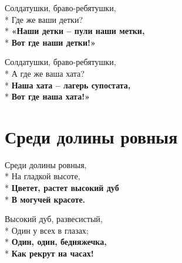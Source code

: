 \medskip

\begin{minipage}{\linewidth}
Солдатушки, браво-ребятушки,\\*
Где же ваши детки?\\*
\textbf{«Наши детки – пули наши метки,}\\*
\textbf{Вот где наши детки!»}\\
\end{minipage}\par\medskip\nobreak

\medskip

\begin{minipage}{\linewidth}
Солдатушки, браво-ребятушки,\\*
А где же ваша хата?\\*
\textbf{Наша хата – лагерь супостата,}\\*
\textbf{Вот где наша хата!»}\\
\end{minipage}

\vspace{\fill}\newpage

\section{Среди долины ровныя}
\label{song:Среди_долины_ровныя}

\medskip

\begin{minipage}{\linewidth}
Среди долины ровныя,\\*
На гладкой высоте,\\*
\textbf{Цветет, растет высокий дуб}\\*
\textbf{В могучей красоте.}\\
\end{minipage}\par\medskip\nobreak

\medskip

\begin{minipage}{\linewidth}
Высокий дуб, развесистый,\\*
Один у всех в глазах;\\*
\textbf{Один, один, бедняжечка,}\\*
\textbf{Как рекрут на часах!}\\
\end{minipage}\par\medskip\nobreak

